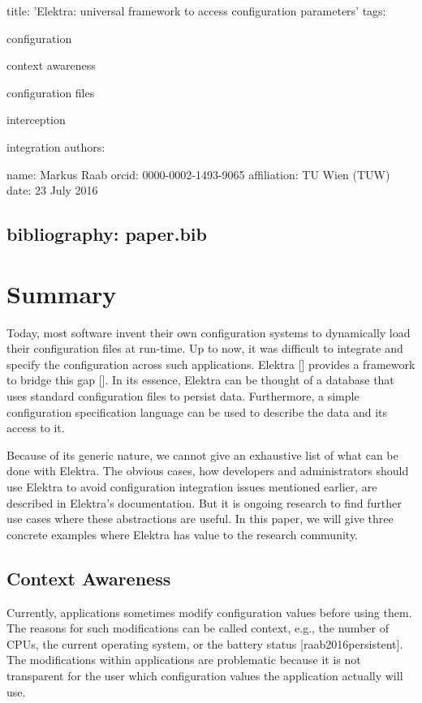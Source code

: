 

 title\+: 'Elektra\+: universal framework to access configuration parameters' tags\+:
\begin{DoxyItemize}
\item configuration
\item context awareness
\item configuration files
\item interception
\item integration authors\+:
\end{DoxyItemize}

name\+: Markus Raab orcid\+: 0000-\/0002-\/1493-\/9065 affiliation\+: T\+U Wien (T\+U\+W) date\+: 23 July 2016 \subsection*{bibliography\+: paper.\+bib }\hypertarget{md_doc_paper_paper_doc_paper_paper_md}{}\section{Summary}\label{md_doc_paper_paper_doc_paper_paper_md}
Today, most software invent their own configuration systems to dynamically load their configuration files at run-\/time. Up to now, it was difficult to integrate and specify the configuration across such applications. Elektra \mbox{[}\mbox{]} provides a framework to bridge this gap \mbox{[}\mbox{]}. In its essence, Elektra can be thought of a database that uses standard configuration files to persist data. Furthermore, a simple configuration specification language can be used to describe the data and its access to it.

Because of its generic nature, we cannot give an exhaustive list of what can be done with Elektra. The obvious cases, how developers and administrators should use Elektra to avoid configuration integration issues mentioned earlier, are described in Elektra's documentation. But it is ongoing research to find further use cases where these abstractions are useful. In this paper, we will give three concrete examples where Elektra has value to the research community.

\subsection*{Context Awareness}

Currently, applications sometimes modify configuration values before using them. The reasons for such modifications can be called context, e.\+g., the number of C\+P\+Us, the current operating system, or the battery status \mbox{[}raab2016persistent\mbox{]}. The modifications within applications are problematic because it is not transparent for the user which configuration values the application actually will use.

